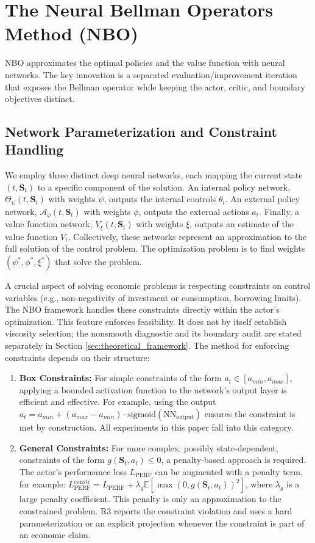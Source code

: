 \documentclass[ecta]{econsocart}
\theoremstyle{plain}
\theoremstyle{remark}
\newcommand{\E}{\mathbb{E}}
\newcommand{\statevec}{\bm{S}}
\begin{document}
\section{The Neural Bellman Operators Method (NBO)}
\label{sec:nbo_method}

NBO approximates the optimal policies and the value function with neural networks. The key innovation is a separated evaluation/improvement iteration that exposes the Bellman operator while keeping the actor, critic, and boundary objectives distinct.

\subsection{Network Parameterization and Constraint Handling}
We employ three distinct deep neural networks, each mapping the current state $(t, \statevec_t)$ to a specific component of the solution. An internal policy network, $\Theta_{\psi}(t, \statevec_t)$ with weights $\psi$, outputs the internal controls $\theta_t$. An external policy network, $\mathcal{A}_{\phi}(t, \statevec_t)$ with weights $\phi$, outputs the external actions $a_t$. Finally, a value function network, $V_{\xi}(t, \statevec_t)$ with weights $\xi$, outputs an estimate of the value function $V_t$. Collectively, these networks represent an approximation to the full solution of the control problem. The optimization problem is to find weights $(\psi^*, \phi^*, \xi^*)$ that solve the problem.

A crucial aspect of solving economic problems is respecting constraints on control variables (e.g., non-negativity of investment or consumption, borrowing limits). The NBO framework handles these constraints directly within the actor's optimization. This feature enforces feasibility. It does not by itself establish viscosity selection; the nonsmooth diagnostic and its boundary audit are stated separately in Section \ref{sec:theoretical_framework}. The method for enforcing constraints depends on their structure:
\begin{enumerate}
    \item \textbf{Box Constraints:} For simple constraints of the form $a_t \in [a_{min}, a_{max}]$, applying a bounded activation function to the network's output layer is efficient and effective. For example, using the output $a_t = a_{min} + (a_{max} - a_{min}) \cdot \text{sigmoid}(\text{NN}_{\text{output}})$ ensures the constraint is met by construction. All experiments in this paper fall into this category.
    \item \textbf{General Constraints:} For more complex, possibly state-dependent, constraints of the form $g(\statevec_t, a_t) \le 0$, a penalty-based approach is required. The actor's performance loss $L_{\text{PERF}}$ can be augmented with a penalty term, for example: $L_{\text{PERF}}^{\text{constr}} = L_{\text{PERF}} + \lambda_g \E[\max(0, g(\statevec_t, a_t))^2]$, where $\lambda_g$ is a large penalty coefficient. This penalty is only an approximation to the constrained problem. R3 reports the constraint violation and uses a hard parameterization or an explicit projection whenever the constraint is part of an economic claim.
\end{enumerate}
\end{document}
